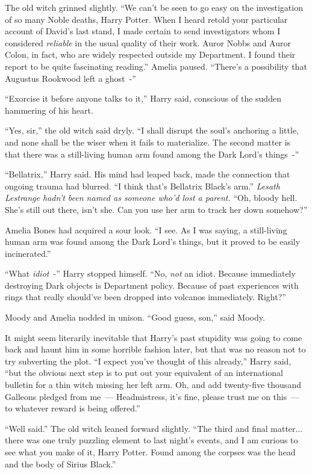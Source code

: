 The old witch grinned slightly. ``We can't be seen to go easy on the investigation of so many Noble deaths, Harry Potter. When I heard retold your particular account of David's last stand, I made certain to send investigators whom I considered \emph{reliable} in the usual quality of their work. Auror Nobbs and Auror Colon, in fact, who are widely respected outside my Department. I found their report to be quite fascinating reading.'' Amelia paused. ``There's a possibility that Augustus Rookwood left a ghost~-''

``Exorcise it before anyone talks to it,'' Harry said, conscious of the sudden hammering of his heart.

``Yes, sir,'' the old witch said dryly. ``I shall disrupt the soul's anchoring a little, and none shall be the wiser when it fails to materialize. The second matter is that there was a still-living human arm found among the Dark Lord's things~-''

``Bellatrix,'' Harry said. His mind had leaped back, made the connection that ongoing trauma had blurred. ``I think that's Bellatrix Black's arm.'' \emph{Lesath Lestrange hadn't been named as someone who'd lost a parent.} ``Oh, bloody hell. She's still out there, isn't she. Can you use her arm to track her down somehow?''

Amelia Bones had acquired a sour look. ``I see. As I was saying, a still-living human arm was found among the Dark Lord's things, but it proved to be easily incinerated.''

``What \emph{idiot}~-'' Harry stopped himself. ``No, \emph{not} an idiot. Because immediately destroying Dark objects is Department policy. Because of past experiences with rings that really should've been dropped into volcanos immediately. Right?''

Moody and Amelia nodded in unison. ``Good guess, son,'' said Moody.

It might seem literarily inevitable that Harry's past stupidity was going to come back and haunt him in some horrible fashion later, but that was no reason not to try subverting the plot. ``I expect you've thought of this already,'' Harry said, ``but the obvious next step is to put out your equivalent of an international bulletin for a thin witch missing her left arm. Oh, and add twenty-five thousand Galleons pledged from me~--- Headmistress, it's fine, please trust me on this~--- to whatever reward is being offered.''

``Well said.'' The old witch leaned forward slightly. ``The third and final matter... there was one truly puzzling element to last night's events, and I am curious to see what you make of it, Harry Potter. Found among the corpses was the head and the body of Sirius Black.''

